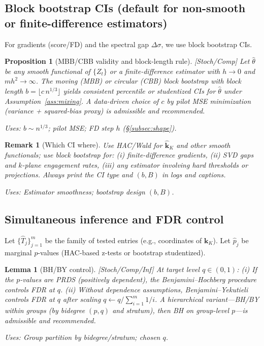 \documentclass[10pt]{article}
\newcommand{\uses}[1]{\par\smallskip\noindent\textit{Uses: }#1\par\smallskip}
\newtheorem{lemma}{Lemma}
\newtheorem{proposition}{Proposition}
\newtheorem{remark}{Remark}
\begin{document}
\subsection{Block bootstrap CIs (default for non-smooth or finite-difference estimators)}\label{subsec:bb}

For gradients (score/FD) and the spectral gap $\Delta\sigma$, we use block bootstrap CIs.

\begin{proposition}[MBB/CBB validity and block-length rule]\label{prop:bb}
\emph{[\textup{Stoch/Comp}]}
Let $\widehat\theta$ be any smooth functional of $\{Z_t\}$ or a finite-difference estimator with $h\to0$ and $mh^2\to\infty$.
The moving (MBB) or circular (CBB) block bootstrap with block length
$b=\lfloor c\,n^{1/3}\rfloor$ yields consistent percentile or studentized CIs for $\widehat\theta$ under Assumption~\ref{ass:mixing}.
A data-driven choice of $c$ by pilot MSE minimization (variance + squared-bias proxy) is admissible and recommended.
\uses{$b\sim n^{1/3}$; pilot MSE; FD step $h$ (\S\ref{subsec:shape}).}
\end{proposition}

\begin{remark}[Which CI where]\label{rem:which-ci}
Use HAC/Wald for $\widehat{\mathbf k}_K$ and other smooth functionals; use block bootstrap for: (i) finite-difference gradients, (ii) SVD gaps and $k$-plane engagement rates, (iii) any estimator involving hard thresholds or projections. Always print the CI type and $(b,B)$ in logs and captions.
\uses{Estimator smoothness; bootstrap design $(b,B)$.}
\end{remark}

\subsection{Simultaneous inference and FDR control}\label{subsec:fdr}

Let $\{\widehat T_j\}_{j=1}^m$ be the family of tested entries (e.g., coordinates of $\mathbf k_K$). Let $\widehat p_j$ be marginal $p$-values (HAC-based z-tests or bootstrap studentized).

\begin{lemma}[BH/BY control]\label{lem:fdr}
\emph{[\textup{Stoch/Comp/Inf}]}
At target level $q\in(0,1)$:
(i) If the $p$-values are PRDS (positively dependent), the Benjamini–Hochberg procedure controls FDR at $q$.
(ii) Without dependence assumptions, Benjamini–Yekutieli controls FDR at $q$ after scaling $q\leftarrow q/\!\sum_{i=1}^m 1/i$.
A hierarchical variant—BH/BY within groups (by bidegree $(p,q)$ and stratum), then BH on group-level $p$—is admissible and recommended.
\uses{Group partition by bidegree/stratum; chosen $q$.}
\end{lemma}
\end{document}
